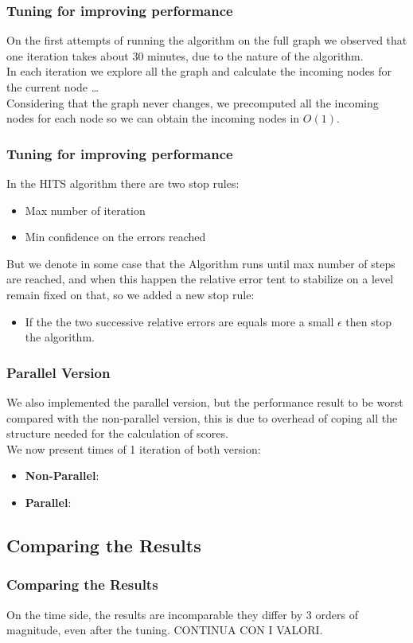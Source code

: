 \documentclass{beamer}
\begin{document}
\begin{frame}
\frametitle{Tuning for improving performance}
On the first attempts of running the algorithm on the full graph we observed that one iteration takes about 30 minutes, due to the nature of the algorithm. \\
In each iteration we explore all the graph and calculate the incoming nodes for the current node \dots\\
\bigskip
Considering that the graph never changes, we precomputed all the incoming nodes for each node so we can obtain the incoming nodes in $O(1)$.
\end{frame}

\begin{frame}
\frametitle{Tuning for improving performance}
In the HITS algorithm there are two stop rules:
\begin{itemize}
\item Max number of iteration
\item Min confidence on the errors reached
\end{itemize}
\medskip
But we denote in some case that the Algorithm runs until max number of steps are reached, and when this happen the relative error tent to stabilize on a level remain fixed on that, so we added a new stop rule: \\
\medskip
\begin{itemize}
\item If the the two successive relative errors are equals more a small $\epsilon$ then stop the algorithm.
\end{itemize}
\end{frame}

\begin{frame}
\frametitle{Parallel Version}
We also implemented the parallel version, but the performance result to be worst compared with the non-parallel version, this is due to overhead of coping all the structure needed for the calculation of scores.\\
\medskip
We now present times of 1 iteration of both version:
\begin{itemize}
\item \textbf{Non-Parallel}: 
\item \textbf{Parallel}:
\end{itemize} 
\end{frame}

\subsection{Comparing the Results}
\begin{frame}
\frametitle{Comparing the Results}
On the time side, the results are incomparable  they differ by $3$ orders of magnitude, even after the tuning.
CONTINUA CON I VALORI.
\end{frame}
\end{document}
